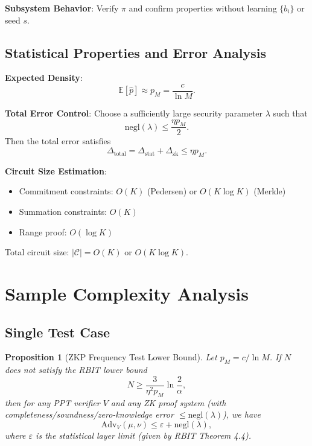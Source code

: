 \documentclass[12pt]{article}
\theoremstyle{plain}
\newtheorem{proposition}[theorem]{Proposition}
\theoremstyle{definition}
\begin{document}
\textbf{Subsystem Behavior}: Verify $\pi$ and confirm properties without learning $\{b_i\}$ or seed $s$.

\subsection{Statistical Properties and Error Analysis}

\textbf{Expected Density}:
\[
\mathbb{E}[\hat{p}] \approx p_M = \frac{c}{\ln M}.
\]

\textbf{Total Error Control}: Choose a sufficiently large security parameter $\lambda$ such that
\[
\text{negl}(\lambda) \le \frac{\eta p_M}{2}.
\]
Then the total error satisfies
\[
\Delta_{\text{total}} = \Delta_{\text{stat}} + \Delta_{\text{zk}} \le \eta p_M.
\]

\textbf{Circuit Size Estimation}:
\begin{itemize}
\item Commitment constraints: $O(K)$ (Pedersen) or $O(K \log K)$ (Merkle)
\item Summation constraints: $O(K)$
\item Range proof: $O(\log K)$
\end{itemize}

Total circuit size: $|\mathcal{C}| = O(K)$ or $O(K \log K)$.

\section{Sample Complexity Analysis}

\subsection{Single Test Case}

\begin{proposition}[ZKP Frequency Test Lower Bound]
Let $p_M = c/\ln M$. If $N$ does not satisfy the RBIT lower bound
\[
N \ge \frac{3}{\eta^2 p_M} \ln \frac{2}{\alpha},
\]
then for any PPT verifier $V$ and any ZK proof system (with completeness/soundness/zero-knowledge error $\le \text{negl}(\lambda)$), we have
\[
\text{Adv}_V(\mu, \nu) \le \varepsilon + \text{negl}(\lambda),
\]
where $\varepsilon$ is the statistical layer limit (given by RBIT Theorem 4.4).
\end{proposition}
\end{document}
